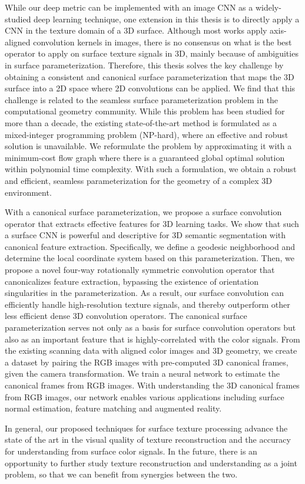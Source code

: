 While our deep metric can be implemented with an image CNN as a widely-studied deep learning technique, one extension in this thesis is to directly apply a CNN in the texture domain of a 3D surface.
%
Although most works apply axis-aligned convolution kernels in images, there is no consensus on what is the best operator to apply on surface texture signals in 3D, mainly because of ambiguities in surface parameterization.
%
Therefore, this thesis solves the key challenge by obtaining a consistent and canonical surface parameterization that maps the 3D surface into a 2D space where 2D convolutions can be applied.
%
We find that this challenge is related to the seamless surface parameterization problem in the computational geometry community. While this problem has been studied for more than a decade, the existing state-of-the-art method is formulated as a mixed-integer programming problem (NP-hard), where an effective and robust solution is unavailable.
%
We reformulate the problem by approximating it with a minimum-cost flow graph where there is a guaranteed global optimal solution within polynomial time complexity. With such a formulation, we obtain a robust and efficient, seamless parameterization for the geometry of a complex 3D environment.

With a canonical surface parameterization, we propose a surface convolution operator that extracts effective features for 3D learning tasks.
%
We show that such a surface CNN is powerful and descriptive for 3D semantic segmentation with canonical feature extraction.
%
Specifically, we define a geodesic neighborhood and determine the local coordinate system based on this parameterization.
Then, we propose a novel four-way rotationally symmetric convolution operator that canonicalizes feature extraction, bypassing the existence of orientation singularities in the parameterization.
%
As a result, our surface convolution can efficiently handle high-resolution texture signals, and thereby outperform other less efficient dense 3D convolution operators.
%
The canonical surface parameterization serves not only as a basis for surface convolution operators but also as an important feature that is highly-correlated with the color signals.
%
From the existing scanning data with aligned color images and 3D geometry, we create a dataset by pairing the RGB images with pre-computed 3D canonical frames, given the camera transformation.
%
We train a neural network to estimate the canonical frames from RGB images. With understanding the 3D canonical frames from RGB images, our network enables various applications including surface normal estimation, feature matching and augmented reality.

In general, our proposed techniques for surface texture processing advance the state of the art in the visual quality of texture reconstruction and the accuracy for understanding from surface color signals. In the future, there is an opportunity to further study texture reconstruction and understanding as a joint problem, so that we can benefit from synergies between the two.